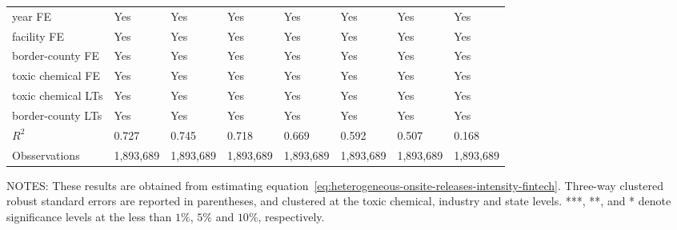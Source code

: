 \begin{table}[H]
{\begin{tabular}{@{}llllllll@{}}
            year FE                         & Yes       & Yes           & Yes       & Yes          & Yes             & Yes           & Yes                 \\
            facility FE                     & Yes       & Yes           & Yes       & Yes          & Yes             & Yes           & Yes                 \\
            border-county FE                & Yes       & Yes           & Yes       & Yes          & Yes             & Yes           & Yes                 \\
            toxic chemical FE               & Yes       & Yes           & Yes       & Yes          & Yes             & Yes           & Yes                 \\
            toxic chemical LTs              & Yes       & Yes           & Yes       & Yes          & Yes             & Yes           & Yes                 \\
            border-county LTs               & Yes       & Yes           & Yes       & Yes          & Yes             & Yes           & Yes                 \\ \midrule
            $R^2$                           & 0.727     & 0.745         & 0.718     & 0.669        & 0.592           & 0.507         & 0.168               \\
            Obsservations                   & 1,893,689 & 1,893,689     & 1,893,689 & 1,893,689    & 1,893,689       & 1,893,689     & 1,893,689           \\ \bottomrule\bottomrule
        \end{tabular}%
    }
    \begin{minipage}{\columnwidth}
        \vspace{0.05in}
        \tiny NOTES: These results are obtained from estimating equation~\ref{eq:heterogeneous-onsite-releases-intensity-fintech}. Three-way clustered robust standard errors are reported in parentheses, and clustered at the toxic chemical, industry and state levels. ***, **, and * denote significance levels at the less than $1\%$, $5\%$ and $10\%$, respectively.
    \end{minipage}
\end{table}